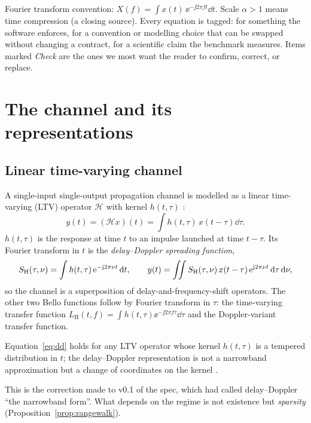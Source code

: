 Fourier transform convention: $X(f)=\int x(t)\,\ee^{-\jj 2\pi f t}\dd t$. Scale $\alpha>1$ means time compression (a closing source). Every equation is tagged: \tagG{} for something the software enforces, \tagP{} for a convention or modelling choice that can be swapped without changing a contract, \tagH{} for a scientific claim the benchmark measures. Items marked \emph{Check} are the ones we most want the reader to confirm, correct, or replace.

\section{The channel and its representations}
\label{sec:channel}

\subsection{Linear time-varying channel}

A single-input single-output propagation channel is modelled as a linear time-varying (LTV) operator $\mathcal H$ with kernel $h(t,\tau)$ \citep{bello1963}:
\begin{equation}
  y(t) = (\mathcal H x)(t) = \int h(t,\tau)\, x(t-\tau)\dd\tau .
  \label{eq:ltv}
\end{equation}
$h(t,\tau)$ is the response at time $t$ to an impulse launched at time $t-\tau$. Its Fourier transform in $t$ is the \emph{delay--Doppler spreading function},
\begin{equation}
  S_{\mathrm{H}}(\tau,\nu) = \int h(t,\tau)\,\mathrm{e}^{-\mathrm{j} 2\pi \nu t}\,\mathrm{d} t,
  \qquad
  y(t) = \iint S_{\mathrm{H}}(\tau,\nu)\, x(t-\tau)\,\mathrm{e}^{\mathrm{j} 2\pi\nu t}\,\mathrm{d}\tau\,\mathrm{d}\nu ,
  \label{eq:dd}
\end{equation}
so the channel is a superposition of delay-and-frequency-shift operators. The other two Bello functions follow by Fourier transform in $\tau$: the time-varying transfer function $L_{\mathrm H}(t,f)=\int h(t,\tau)\ee^{-\jj 2\pi f\tau}\dd\tau$ and the Doppler-variant transfer function.

\begin{proposition}[Existence]
\label{prop:existence}
Equation~\eqref{eq:dd} holds for any LTV operator whose kernel $h(t,\tau)$ is a tempered distribution in $t$; the delay--Doppler representation is not a narrowband approximation but a change of coordinates on the kernel \citep{matz2013}.
\end{proposition}
\noindent This is the correction made to v0.1 of the spec, which had called delay--Doppler ``the narrowband form''. What depends on the regime is not existence but \emph{sparsity} (Proposition~\ref{prop:rangewalk}).

